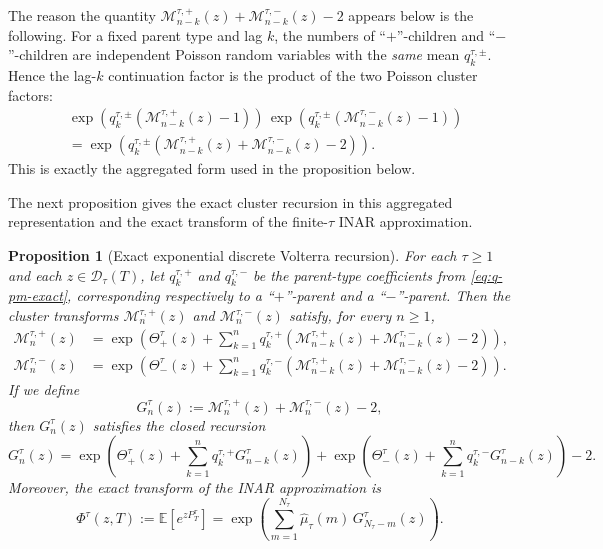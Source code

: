 \documentclass[letterpaper]{article}
\numberwithin{equation}{section}
\newtheorem{proposition}[theorem]{Proposition}
\theoremstyle{definition}
\theoremstyle{remark}
\newcommand{\E}{\mathbb{E}}
\begin{document}
The reason the quantity $\mathcal M_{n-k}^{\tau,+}(z)+\mathcal M_{n-k}^{\tau,-}(z)-2$ appears below is the following. For a fixed parent type and lag $k$, the numbers of ``$+$''-children and ``$-$''-children are independent Poisson random variables with the \emph{same} mean $q_k^{\tau,\pm}$. Hence the lag-$k$ continuation factor is the product of the two Poisson cluster factors:
\begin{align*}
  &\exp\!\left(q_k^{\tau,\pm}(\mathcal M_{n-k}^{\tau,+}(z)-1)\right)\,
  \exp\!\left(q_k^{\tau,\pm}(\mathcal M_{n-k}^{\tau,-}(z)-1)\right)\\
  &=
  \exp\!\left(q_k^{\tau,\pm}(\mathcal M_{n-k}^{\tau,+}(z)+\mathcal M_{n-k}^{\tau,-}(z)-2)\right).
\end{align*}
This is exactly the aggregated form used in the proposition below.

The next proposition gives the exact cluster recursion in this aggregated representation and the exact transform of the finite-$\tau$ INAR approximation.

\begin{proposition}[Exact exponential discrete Volterra recursion]\label{prop:exact-transform-weak}
For each $\tau\ge1$ and each $z\in\mathcal D_\tau(T)$, let $q_k^{\tau,+}$ and $q_k^{\tau,-}$ be the parent-type coefficients from \eqref{eq:q-pm-exact}, corresponding respectively to a ``$+$''-parent and a ``$-$''-parent. Then the cluster transforms $\mathcal M_n^{\tau,+}(z)$ and $\mathcal M_n^{\tau,-}(z)$ satisfy, for every $n\ge1$,
\begin{align}
  \mathcal M_n^{\tau,+}(z)
  &=\exp\!\left(
      \Theta_+^\tau(z)
      +\sum_{k=1}^n q_k^{\tau,+}
       \left(\mathcal M_{n-k}^{\tau,+}(z)+\mathcal M_{n-k}^{\tau,-}(z)-2\right)
    \right), \label{eq:Mplus-exact}
  \\
  \mathcal M_n^{\tau,-}(z)
  &=\exp\!\left(
      \Theta_-^\tau(z)
      +\sum_{k=1}^n q_k^{\tau,-}
       \left(\mathcal M_{n-k}^{\tau,+}(z)+\mathcal M_{n-k}^{\tau,-}(z)-2\right)
    \right). \label{eq:Mminus-exact}
\end{align}
If we define
\begin{equation}\label{eq:Gn-exact}
  G_n^\tau(z):=\mathcal M_n^{\tau,+}(z)+\mathcal M_n^{\tau,-}(z)-2,
\end{equation}
then $G_n^\tau(z)$ satisfies the closed recursion
\begin{equation}\label{eq:G-rec-exact}
  G_n^\tau(z)
  =\exp\!\left(
      \Theta_+^\tau(z)+\sum_{k=1}^n q_k^{\tau,+}G_{n-k}^\tau(z)
    \right)
   +\exp\!\left(
      \Theta_-^\tau(z)+\sum_{k=1}^n q_k^{\tau,-}G_{n-k}^\tau(z)
    \right)-2.
\end{equation}
Moreover, the exact transform of the INAR approximation is
\begin{equation}\label{eq:Phi-exact}
  \Phi^\tau(z,T):=\E\!\left[e^{zP_T^\tau}\right]
  =\exp\!\left(\sum_{m=1}^{N_\tau}\hat\mu_\tau(m)\,G_{N_\tau-m}^\tau(z)\right).
\end{equation}
\end{proposition}
\end{document}
